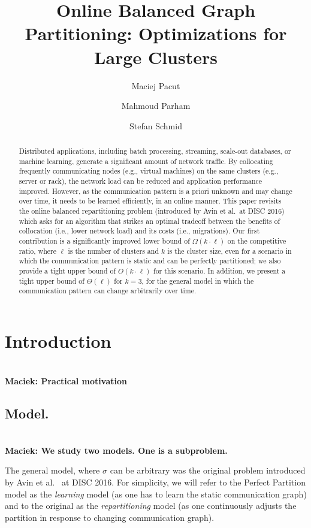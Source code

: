 \documentclass[manuscript,screen=true, review, anonymous]{acmart}
\title{Online Balanced Graph Partitioning: Optimizations for Large Clusters}
\author{Maciej Pacut}
\affiliation{%
 \institution{Faculty of Computer Science, University of Vienna}
 \country{Austria}
 }
\author{Mahmoud Parham}
\affiliation{%
 \institution{Faculty of Computer Science, University of Vienna}
 \country{Austria}
 }
\author{Stefan Schmid}
\affiliation{%
 \institution{Faculty of Computer Science, University of Vienna}
 \country{Austria}
 }
\newcommand\maciek[1]{\color{brown}\textbf{\\ Maciek: #1}\color{black}}
\begin{document}
\begin{abstract}
	Distributed   applications,  including  batch  processing, streaming, scale-out databases,
	or machine learning, generate a significant amount of network traffic. By collocating frequently communicating nodes (e.g., virtual machines) on the same clusters (e.g., server or rack), the network load can be reduced and application performance improved. 
	However, as the communication pattern is a priori unknown and may change over time, it needs to be learned efficiently, in an online manner.
	This paper revisits the online 
	balanced repartitioning problem 
	(introduced by Avin et al.~at DISC 2016)
	which asks for an algorithm that strikes
	an optimal tradeoff between the benefits
	of collocation (i.e., lower network load) 
	and its costs (i.e., migrations). 
	Our first contribution is a significantly improved
	lower bound of $\Omega(k\cdot \ell)$ on the
	competitive ratio, where $\ell$ is the number
	of clusters and $k$ is the cluster size,
	even for a scenario in which the communication
	pattern is static and can be perfectly partitioned;
	we also provide a tight upper bound 
	of $O(k\cdot \ell)$ for this scenario.
	In addition, we present a tight upper bound
	of $\Theta(\ell)$ for $k=3$,
	for the general model in which the
	communication pattern can change arbitrarily
	over time. 
\end{abstract}

\maketitle

\renewcommand{\shortauthors}{M.~Pacut, M.~Parham, S.~Schmid}

\section{Introduction}

\maciek{Practical motivation}

\subsection{Model.}

\maciek{We study two models. One is a subproblem.}

The general model, where $\sigma$ can be arbitrary
was the original problem introduced
by Avin et al.~\cite{repartition-disc} at DISC 2016.
For simplicity, we will refer to the Perfect Partition
model as the \emph{learning} model (as
one has to learn the static communication graph) 
and to the original as the \emph{repartitioning} model (as one continuously adjusts the partition in response to changing communication graph).
\end{document}
